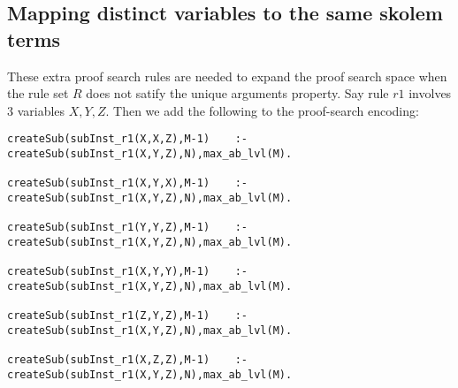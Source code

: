 \subsection{Mapping distinct variables to the same skolem terms}
These extra proof search rules are needed to expand the proof search space when the rule set $R$ does not satify the unique arguments property. Say rule $r1$ involves 3 variables $X, Y, Z$. Then we add the following to the proof-search encoding:
\begin{verbatim}
createSub(subInst_r1(X,X,Z),M-1)    :-createSub(subInst_r1(X,Y,Z),N),max_ab_lvl(M).

createSub(subInst_r1(X,Y,X),M-1)    :-createSub(subInst_r1(X,Y,Z),N),max_ab_lvl(M).

createSub(subInst_r1(Y,Y,Z),M-1)    :-createSub(subInst_r1(X,Y,Z),N),max_ab_lvl(M).

createSub(subInst_r1(X,Y,Y),M-1)    :-createSub(subInst_r1(X,Y,Z),N),max_ab_lvl(M).

createSub(subInst_r1(Z,Y,Z),M-1)    :-createSub(subInst_r1(X,Y,Z),N),max_ab_lvl(M).

createSub(subInst_r1(X,Z,Z),M-1)    :-createSub(subInst_r1(X,Y,Z),N),max_ab_lvl(M).
\end{verbatim}


